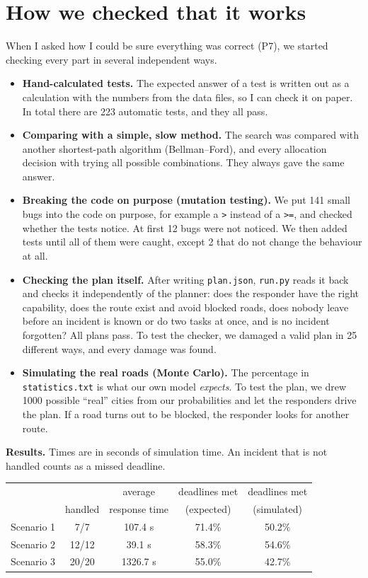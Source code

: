 \documentclass[11pt,a4paper]{article}
\begin{document}
\section{How we checked that it works}

When I asked how I could be sure everything was correct (P7), we started
checking every part in several independent ways.

\begin{itemize}
  \item \textbf{Hand-calculated tests.} The expected answer of a test is written
    out as a calculation with the numbers from the data files, so I can check it
    on paper. In total there are 223 automatic tests, and they all pass.
  \item \textbf{Comparing with a simple, slow method.} The search was compared
    with another shortest-path algorithm (Bellman--Ford), and every allocation
    decision with trying all possible combinations. They always gave the same
    answer.
  \item \textbf{Breaking the code on purpose (mutation testing).} We put 141
    small bugs into the code on purpose, for example a \texttt{>} instead of a
    \texttt{>=}, and checked whether the tests notice. At first 12 bugs were
    not noticed. We then added tests until all of them were caught, except 2
    that do not change the behaviour at all.
  \item \textbf{Checking the plan itself.} After writing \texttt{plan.json},
    \texttt{run.py} reads it back and checks it independently of the planner:
    does the responder have the right capability, does the route exist and
    avoid blocked roads, does nobody leave before an incident is known or do two
    tasks at once, and is no incident forgotten? All plans pass. To test the
    checker, we damaged a valid plan in 25 different ways, and every damage was
    found.
  \item \textbf{Simulating the real roads (Monte Carlo).} The percentage in
    \texttt{statistics.txt} is what our own model \emph{expects}. To test the
    plan, we drew 1000 possible ``real'' cities from our probabilities and let
    the responders drive the plan. If a road turns out to be blocked, the
    responder looks for another route.
\end{itemize}

\textbf{Results.} Times are in seconds of simulation time. An incident that is
not handled counts as a missed deadline.

\begin{center}
\begin{tabular}{lcccc}
  \toprule
  & & average & deadlines met & deadlines met \\
  & handled & response time & (expected) & (simulated) \\
  \midrule
  Scenario 1 & 7/7   & 107.4 s  & 71.4\% & 50.2\% \\
  Scenario 2 & 12/12 & 39.1 s   & 58.3\% & 54.6\% \\
  Scenario 3 & 20/20 & 1326.7 s & 55.0\% & 42.7\% \\
  \bottomrule
\end{tabular}
\end{center}
\end{document}
